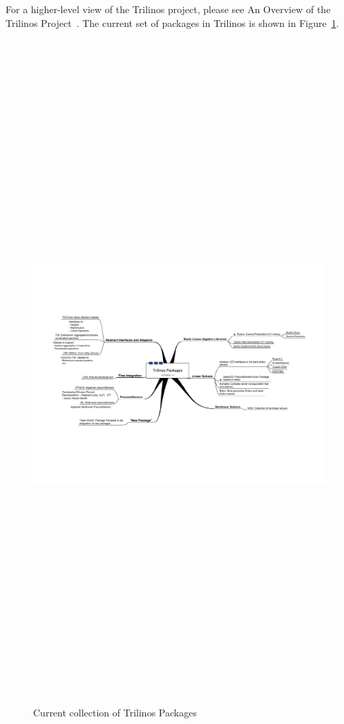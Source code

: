 \documentclass[12pt,relax]{TrilinosDevGuide}
\begin{document}
For a higher-level view of the Trilinos project, please see An Overview
of the Trilinos Project~\cite{TrilinosOverview}. The current set of
packages in Trilinos is shown in Figure~\ref{Figure:TrilinosPackages}.
\begin{figure}
\begin{center}
\includegraphics[height=10in]{Trilinos_Packages_Diagram}
\end{center}
\label{Figure:TrilinosPackages}
\caption{Current collection of Trilinos Packages}
\end{figure}
\end{document}

